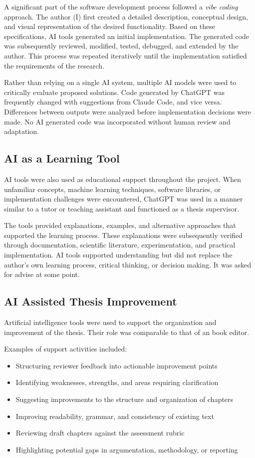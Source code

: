 A significant part of the software development process followed a \emph{vibe coding} approach. The author (I) first created a detailed description, conceptual design, and visual representation of the desired functionality. Based on these specifications, AI tools generated an initial implementation. The generated code was subsequently reviewed, modified, tested, debugged, and extended by the author. This process was repeated iteratively until the implementation satisfied the requirements of the research.

Rather than relying on a single AI system, multiple AI models were used to critically evaluate proposed solutions. Code generated by ChatGPT was frequently changed with suggestions from Claude Code, and vice versa. Differences between outputs were analyzed before implementation decisions were made. No AI generated code was incorporated without human review and adaptation.

\subsection{AI as a Learning Tool}

AI tools were also used as educational support throughout the project. When unfamiliar concepts, machine learning techniques, software libraries, or implementation challenges were encountered, ChatGPT was used in a manner similar to a tutor or teaching assistant and functioned as a thesis supervisor.

The tools provided explanations, examples, and alternative approaches that supported the learning process. These explanations were subsequently verified through documentation, scientific literature, experimentation, and practical implementation. AI tools supported understanding but did not replace the author's own learning process, critical thinking, or decision making. It was asked for advise at some point.

\subsection{AI Assisted Thesis Improvement}

Artificial intelligence tools were used to support the organization and improvement of the thesis. Their role was comparable to that of an book editor.

Examples of support activities included:

\begin{itemize}
    \item Structuring reviewer feedback into actionable improvement points
    \item Identifying weaknesses, strengths, and areas requiring clarification
    \item Suggesting improvements to the structure and organization of chapters
    \item Improving readability, grammar, and consistency of existing text
    \item Reviewing draft chapters against the assessment rubric
    \item Highlighting potential gaps in argumentation, methodology, or reporting
\end{itemize}

